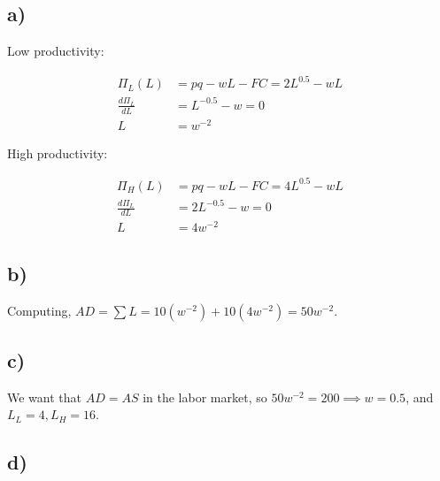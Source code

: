 \documentclass[12pt,letterpaper]{article}
\theoremstyle{definition}
\begin{document}
\subsection*{a)}

Low productivity:

\begin{align*}
  \Pi_L(L) &= pq - wL - FC = 2L^{0.5} - wL \\
  \frac{d\Pi_L}{dL} &= L^{-0.5} - w = 0 \\
  L &= w^{-2}
\end{align*}

High productivity:

\begin{align*}
  \Pi_H(L) &= pq - wL - FC = 4L^{0.5} - wL \\
  \frac{d\Pi_L}{dL} &= 2L^{-0.5} - w = 0 \\
  L &= 4w^{-2}
\end{align*}

\subsection*{b)}

Computing, $AD = \sum L = 10(w^{-2}) + 10(4w^{-2}) = 50w^{-2}$.

\subsection*{c)}

We want that $AD = AS$ in the labor market, so $50w^{-2} = 200 \implies w =
0.5$, and $L_L = 4, L_H = 16$.

\subsection*{d)}
\end{document}

